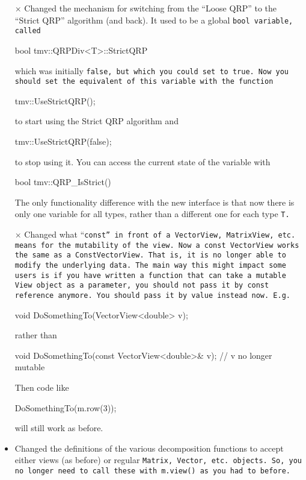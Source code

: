 \begin{itemize}
\item[$\times$]
Changed the mechanism for switching from the ``Loose QRP'' to the ``Strict QRP''
algorithm (and back).  It used to be a global \tt{bool} variable, called
\begin{tmvcode}
bool tmv::QRPDiv<T>::StrictQRP
\end{tmvcode}
which was initially \tt{false}, but which you could set to \tt{true}.
Now you should set the equivalent of this variable with the function
\begin{tmvcode}
tmv::UseStrictQRP();
\end{tmvcode}
to start using the Strict QRP algorithm and
\begin{tmvcode}
tmv::UseStrictQRP(false);
\end{tmvcode}
to stop using it.  You can access the current state of the variable with
\begin{tmvcode}
bool tmv::QRP_IsStrict()
\end{tmvcode}
The only functionality difference with the new interface is that now there
is only one variable for all types, rather than a different one for each
type \tt{T}.

\item[$\times$]
Changed what ``\tt{const}'' in front of a \tt{VectorView},
\tt{MatrixView}, etc. means for the mutability of the view. 
Now a \tt{const VectorView} works the same as a 
\tt{ConstVectorView}.
That is, it is no longer able to modify the underlying data.
The main way this might impact some users is if you have written a function
that can take a mutable \tt{View} object as a parameter, you should not pass it
by \tt{const} reference anymore.  You should pass it by value instead now.  E.g.
\begin{tmvcode}
void DoSomethingTo(VectorView<double> v);
\end{tmvcode}
rather than
\begin{tmvcode}
void DoSomethingTo(const VectorView<double>& v); // v no longer mutable 
\end{tmvcode}
Then code like 
\begin{tmvcode}
DoSomethingTo(m.row(3));
\end{tmvcode}
will still work as before.

\item
Changed the definitions of the various decomposition functions
to accept either views (as before) or regular \tt{Matrix}, \tt{Vector},
etc. objects.  So, you no longer need to call these with \tt{m.view()}
as you had to before.


\end{itemize}
